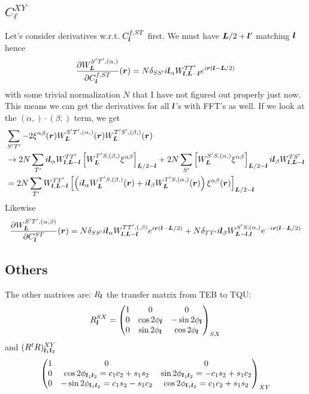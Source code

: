\documentclass[11pt]{article}
\begin{document}
\subsection{$C_\ell^{XY}$}
Let's consider derivatives w.r.t. $C^{f, ST}_{\boldsymbol{l}}$ first.  We must have $\boldsymbol{L}/2 + \boldsymbol{l}'$ matching $\boldsymbol{l}$ hence
\begin{equation}
	\frac{\partial W_{\boldsymbol{L}}^{S'T', (\alpha,)}}{\partial C_{\boldsymbol{l}}^{f, ST}}(\boldsymbol{r}) = N\delta_{SS'}i\boldsymbol{l}_\alpha W^{TT'}_{\boldsymbol{l}, \boldsymbol{L}-\boldsymbol{l}}e^{i \boldsymbol{r} \left(\boldsymbol{l} - \boldsymbol{L}/2 \right)}
\end{equation}
with some trivial normalization $N$ that I have not figured out properly just now. This means we can get the derivatives for all $\boldsymbol{l}$'s with FFT's as well. 
If we look at the $(\alpha,) \cdot (\beta,)$ term, we get
\begin{equation}
\begin{split}
&\sum_{S'T'} -2 \xi^{\alpha\beta}(\boldsymbol{r})W_{\boldsymbol{L}}^{S'T',(\alpha,)}(\boldsymbol{r})W_{\boldsymbol{L}}^{T'S',(\beta,)}(\boldsymbol{r}) \\ &\rightarrow 2N \sum_{T'} i\boldsymbol{l}_\alpha W^{TT'}_{\boldsymbol{l}, \boldsymbol{L} - \boldsymbol{l}} \left[W_{\boldsymbol{L}}^{T'S, (\beta,)} \xi^{\alpha \beta}\right ]_{\boldsymbol{L}/2 - \boldsymbol{l}}  +2N\sum_{S'}\left[W_{\boldsymbol{L}}^{S'S, (\alpha,)} \xi^{\alpha \beta}\right ]_{\boldsymbol{L}/2 - \boldsymbol{l}}  i\boldsymbol{l}_\beta W^{TS'}_{\boldsymbol{l}, \boldsymbol{L} - \boldsymbol{l}} \\
&= 2 N \sum_{T'} W^{TT'}_{\boldsymbol{l}, \boldsymbol{L} - \boldsymbol{l}} \left[  \left(i\boldsymbol{l}_\alpha W_{\boldsymbol{L}}^{T'S, (\beta,)}(\boldsymbol{r}) + i\boldsymbol{l}_\beta W_{\boldsymbol{L}}^{T'S, (\alpha,)}(\boldsymbol{r}) \right )  \xi^{\alpha \beta}(\boldsymbol{r})\right]_{\boldsymbol{L}/2 - \boldsymbol{l}}
\end{split}
\end{equation}
Likewise
\begin{equation}
		\frac{\partial W_{\boldsymbol{L}}^{S'T', (\alpha, \beta)}}{\partial C_{\boldsymbol{l}}^{ST}}(\boldsymbol{r}) = N\delta_{SS'}i\boldsymbol{l}_\alpha W^{TT', (,\beta)}_{\boldsymbol{l}, \boldsymbol{L}-\boldsymbol{l}}e^{i \boldsymbol{r} \left(\boldsymbol{l} - \boldsymbol{L}/2 \right)} + N \delta_{TT'} i\boldsymbol{l}_\beta W^{S'S, (\alpha,)}_{\boldsymbol{L}-\boldsymbol{l}, \boldsymbol{l}} e^{-i\boldsymbol{r}(\boldsymbol{l} -\boldsymbol{L}/2)}
\end{equation}
\subsection{Others}
The other matrices are: $R_{\boldsymbol{l}}$ the transfer matrix from TEB to TQU:
\begin{equation} R^{SX}_{\boldsymbol{l}} = 
	\begin{pmatrix}
		1 & 0 & 0 \\ 0 & \cos 2\phi_{\boldsymbol{l}} & -\sin 2\phi_{\boldsymbol{l}} \\ 0 & \sin 2\phi_{\boldsymbol{l}} & \cos 2\phi_{\boldsymbol{l}}
	\end{pmatrix}_{SX}
\end{equation}
and $(R^tR)^{XY}_{\boldsymbol{l}_1\boldsymbol{l}_2}$
\begin{equation}
		\begin{pmatrix}
		1 & 0 & 0 \\ 0 & \cos 2\phi_{\boldsymbol{l}_1\boldsymbol{l}_2}= c_1c_2 + s_1 s_2 & \sin 2\phi_{\boldsymbol{l}_1\boldsymbol{l}_2}= -c_1s_2 + s_1 c_2 \\ 0 & -\sin 2\phi_{\boldsymbol{l}_1\boldsymbol{l}_2}= c_1s_2 - s_1 c_2 & \cos 2\phi_{\boldsymbol{l}_1\boldsymbol{l}_2}= c_1c_2 + s_1 s_2
	\end{pmatrix}_{XY}
\end{equation}
\end{document}
